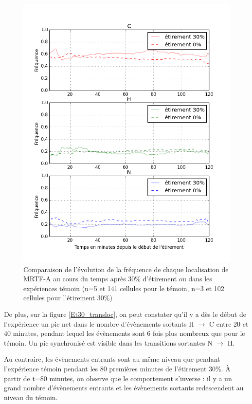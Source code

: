 \begin{figure}
\includegraphics[scale=0.5]{Figures/Etirement30_vs_0_dynamique.png} 
\caption{\label{Et30_CHN} Comparaison de l'évolution de la fréquence de chaque localisation de MRTF-A au cours du temps après 30\% d'étirement ou dans les expériences témoin (n=5 et 141 cellules pour le témoin, n=3 et 102 cellules pour l'étirement 30\%)}
\end{figure}

De plus, sur la figure \ref{Et30_transloc}, on peut constater qu'il y a dès le début de l'expérience un pic net dans le nombre d'évènements sortants H $\rightarrow$ C entre 20 et 40 minutes, pendant lequel les évènements sont 6 fois plus nombreux que pour le témoin. Un pic synchronisé est visible dans les transitions sortantes N $\rightarrow$ H. 

Au contraire, les évènements entrants sont au même niveau que pendant l'expérience témoin pendant les 80 premières minutes de l'étirement 30\%. À partir de t=80 minutes, on observe que le comportement s'inverse : il y a un grand nombre d'évènements entrants et les évènements sortants redescendent au niveau du témoin. 

